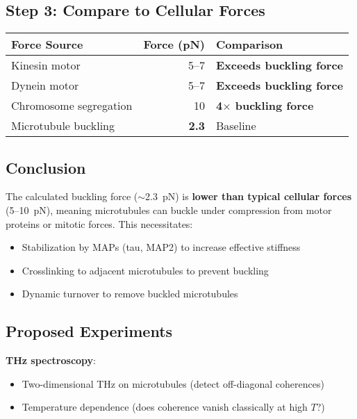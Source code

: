 \subsection*{Step 3: Compare to Cellular Forces}

\begin{center}
\begin{tabular}{@{}lrl@{}}
\toprule
Force Source & \multicolumn{1}{c}{Force (pN)} & Comparison \\
\midrule
Kinesin motor & 5--7 & \textbf{Exceeds buckling force} \\
Dynein motor & 5--7 & \textbf{Exceeds buckling force} \\
Chromosome segregation & 10 & \textbf{4$\times$ buckling force} \\
Microtubule buckling & \textbf{2.3} & Baseline \\
\bottomrule
\end{tabular}
\end{center}

\subsection*{Conclusion}

The calculated buckling force ($\sim$2.3~pN) is \textbf{lower than typical cellular forces} (5--10~pN), meaning microtubules can buckle under compression from motor proteins or mitotic forces. This necessitates:
\begin{itemize}
\item Stabilization by MAPs (tau, MAP2) to increase effective stiffness
\item Crosslinking to adjacent microtubules to prevent buckling
\item Dynamic turnover to remove buckled microtubules
\end{itemize}

\subsection{Proposed Experiments}\label{proposed-experiments}

\textbf{THz spectroscopy}:
\begin{itemize}
\item Two-dimensional THz on microtubules (detect
off-diagonal coherences)
\item Temperature dependence (does coherence vanish
classically at high \(T\)?)
\end{itemize}


